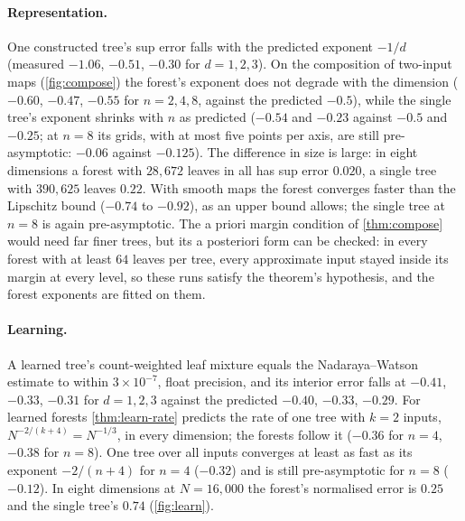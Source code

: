 \documentclass[11pt]{article}
\theoremstyle{definition}
\theoremstyle{remark}
\begin{document}
\paragraph{Representation.}
One constructed tree's sup error falls with the predicted exponent $-1/d$
(measured $-1.06$, $-0.51$, $-0.30$ for $d=1,2,3$).  On the composition of two-input maps
(\cref{fig:compose}) the forest's exponent does not degrade with the dimension ($-0.60$,
$-0.47$, $-0.55$ for $n=2,4,8$, against the predicted $-0.5$), while the single tree's exponent shrinks with $n$ as
predicted ($-0.54$ and $-0.23$ against $-0.5$ and $-0.25$; at $n=8$ its grids, with at most five
points per axis, are still pre-asymptotic: $-0.06$ against $-0.125$).  The difference in size
is large: in eight dimensions a forest with $28{,}672$ leaves in all has sup error $0.020$, a
single tree with $390{,}625$ leaves $0.22$.  With smooth maps the forest converges faster than the Lipschitz bound ($-0.74$ to
$-0.92$), as an upper bound allows; the single tree at $n=8$ is again pre-asymptotic.
The a priori margin condition of \cref{thm:compose} would need far finer trees, but its a
posteriori form can be checked: in every forest with at least $64$ leaves per tree, every
approximate input stayed inside its margin at every level, so these runs satisfy the
theorem's hypothesis, and the forest exponents are fitted on them.

\paragraph{Learning.}
A learned tree's count-weighted leaf mixture equals the Nadaraya--Watson
estimate to within $3\times10^{-7}$, float precision, and its interior error falls at $-0.41$,
$-0.33$, $-0.31$ for $d=1,2,3$ against the predicted $-0.40$, $-0.33$, $-0.29$.  For learned
forests \cref{thm:learn-rate} predicts the rate of one tree with $k=2$ inputs,
$N^{-2/(k+4)}=N^{-1/3}$, in every dimension; the forests follow it ($-0.36$ for $n=4$, $-0.38$
for $n=8$).  One tree
over all inputs converges at least as fast as its exponent $-2/(n+4)$ for $n=4$ ($-0.32$) and
is still pre-asymptotic for $n=8$ ($-0.12$).  In eight dimensions at $N=16{,}000$ the forest's
normalised error is $0.25$ and the single tree's $0.74$ (\cref{fig:learn}).
\end{document}
